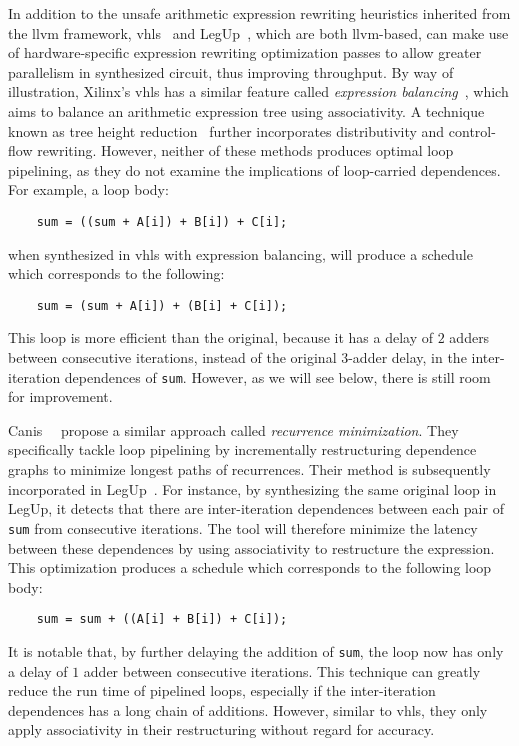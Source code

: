 In addition to the unsafe arithmetic expression rewriting heuristics
inherited from the \gls{llvm} framework, \gls{vhls}~\cite{vivado_hls}
and LegUp~\cite{legup}, which are both \gls{llvm}-based, can make use
of hardware-specific expression rewriting optimization passes to allow
greater parallelism in synthesized circuit, thus improving throughput.  By
way of illustration, Xilinx's \gls{vhls} has a similar feature called
\emph{expression balancing}~\cite{vivado_hls}, which aims to balance an
arithmetic expression tree using associativity.  A technique known as tree
height reduction~\cite{nicolau91} further incorporates distributivity and
control-flow rewriting.  However, neither of these methods produces optimal
loop pipelining, as they do not examine the implications of loop-carried
dependences.  For example, a loop body:
\begin{lstlisting}
    sum = ((sum + A[i]) + B[i]) + C[i];
\end{lstlisting}\vspace{-15pt}
when synthesized in \gls{vhls} with expression balancing, will produce a
schedule which corresponds to the following:
\begin{lstlisting}
    sum = (sum + A[i]) + (B[i] + C[i]);
\end{lstlisting}\vspace{-15pt}
This loop is more efficient than the original, because it has a delay of $2$
adders between consecutive iterations, instead of the original $3$-adder delay,
in the inter-iteration dependences of \verb|sum|.  However, as we will see
below, there is still room for improvement.

Canis~\etal~\cite{canis14} propose a similar approach called \emph{recurrence
minimization}.  They specifically tackle loop pipelining by incrementally
restructuring dependence graphs to minimize longest paths of recurrences.
Their method is subsequently incorporated in LegUp~\cite{legup}.  For instance,
by synthesizing the same original loop in LegUp, it detects that there are
inter-iteration dependences between each pair of \verb|sum| from consecutive
iterations.  The tool will therefore minimize the latency between these
dependences by using associativity to restructure the expression.  This
optimization produces a schedule which corresponds to the following loop body:
\begin{lstlisting}
    sum = sum + ((A[i] + B[i]) + C[i]);
\end{lstlisting}\vspace{-15pt}
It is notable that, by further delaying the addition of \verb|sum|, the loop
now has only a delay of $1$ adder between consecutive iterations.  This
technique can greatly reduce the run time of pipelined loops, especially if the
inter-iteration dependences has a long chain of additions.  However, similar to
\gls{vhls}, they only apply associativity in their restructuring without regard
for accuracy.


